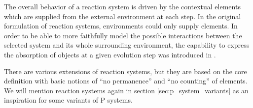 The overall behavior of a reaction system is driven by the contextual elements which are supplied from the external environment at each step. In the original formulation of reaction systems, environments could only supply elements. In order to be able to more faithfully model the possible interactions between the selected system and its whole surrounding environment, the capability to express the absorption of objects at a given evolution step was introduced in \cite{Barbuti17ReactionGenContext}.

There are various extensions of reaction systems, but they are based on the core definition with basic notions of ``no permanence'' and ``no counting'' of elements.
We will mention reaction systems again in section \ref{sec:p_system_variants} as an inspiration for some variants of P systems.
